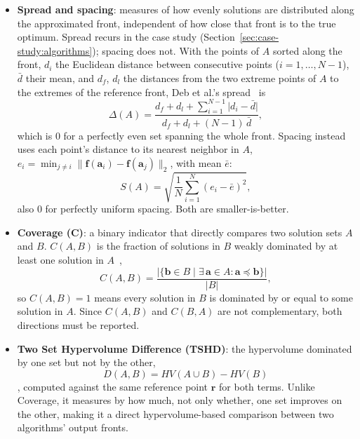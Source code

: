 \begin{itemize}
    and smaller is better.
  \item \textbf{Spread and spacing}: measures of how evenly solutions are
    distributed along the approximated front, independent of how close
    that front is to the true optimum. Spread recurs in the case study
    (Section~\ref{sec:case-study:algorithms}); spacing does not. With
    the points of $A$ sorted along the front, $d_i$ the Euclidean
    distance between consecutive points ($i = 1, \dots, N-1$),
    $\bar{d}$ their mean, and $d_f$, $d_l$ the distances from the two
    extreme points of $A$ to the extremes of the reference front,
    Deb et al.'s spread~\citep{deb2002nsga2} is
    \begin{equation}
      \Delta(A) = \frac{d_f + d_l + \sum_{i=1}^{N-1} \lvert d_i - \bar{d}
      \rvert}{d_f + d_l + (N-1)\,\bar{d}},
    \end{equation}
    which is $0$ for a perfectly even set spanning the whole front.
    Spacing instead uses each point's distance to its nearest neighbor
    in $A$, $e_i = \min_{j \ne i} \lVert \mathbf{f}(\mathbf{a}_i) -
    \mathbf{f}(\mathbf{a}_j) \rVert_2$, with mean $\bar{e}$:
    \begin{equation}
      S(A) = \sqrt{\frac{1}{N} \sum_{i=1}^{N} (e_i - \bar{e})^2},
    \end{equation}
    also $0$ for perfectly uniform spacing. Both are smaller-is-better.
  \item \textbf{Coverage (C)}: a binary indicator that directly compares
    two solution sets $A$ and $B$. $C(A,B)$ is the fraction of solutions
    in $B$ weakly dominated by at least one solution in
    $A$~\citep{zitzler1999spea,zitzler2003performance},
    \begin{equation}
      C(A, B) = \frac{\lvert \{ \mathbf{b} \in B \mid \exists\, \mathbf{a}
      \in A : \mathbf{a} \preceq \mathbf{b} \} \rvert}{\lvert B \rvert},
    \end{equation}
    so $C(A,B)=1$
    means every solution in $B$ is dominated by or equal to some
    solution in $A$. Since $C(A,B)$ and $C(B,A)$ are not complementary,
    both directions must be reported.
  \item \textbf{Two Set Hypervolume Difference (TSHD)}: the hypervolume
    dominated by one set but not by the other,
    \begin{equation}
      D(A,B) = HV(A \cup B) - HV(B)
    \end{equation}
    \citep{zitzler1999thesis}, computed against the same reference point
    $\mathbf{r}$ for both terms. Unlike
    Coverage, it measures by how much, not only whether, one set
    improves on the other, making it a direct hypervolume-based
    comparison between two algorithms' output fronts.
\end{itemize}

